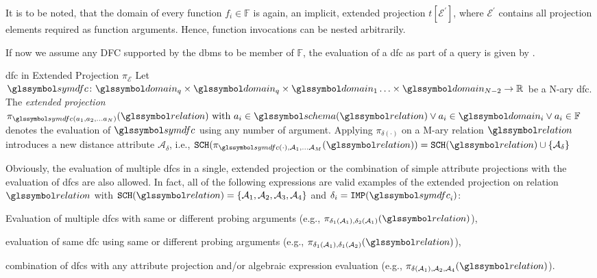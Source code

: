 It is to be noted, that the domain of every function $f_i \in \mathbb{F}$ is again, an implicit, extended projection $t \left[ \mathcal{E}^{'}\right]$, where $\mathcal{E}^{'}$ contains all projection elements required as function arguments. Hence, function invocations can be nested arbitrarily.

If now we assume any DFC supported by the \acrshort{dbms} to be member of $\mathbb{F}$, the evaluation of a \acrshort{dfc} as part of a query is given by .

\begin{definition}[label=definition:dfc_rel]{\acrlong{dfc} in Extended Projection $\pi_{\mathcal{E}}$}{}
    Let $\symdfc \colon \domain_q \times \domain_q \times \domain_{1} \ldots \times \domain_{N-2} \to \mathbb{R}$ be a N-ary \acrshort{dfc}. The \emph{extended projection} $\pi_{\symdfc(a_1, a_2, \ldots a_N)}(\relation) \textrm { with } a_i \in \schema(\relation) \vee a_i \in \domain_i \vee a_i \in \mathbb{F}$ denotes the evaluation of $\symdfc$ using any number of argument. Applying $\pi_{\delta(\cdot)}$ on a M-ary relation $\relation$ introduces a new distance attribute $\mathcal{A}_\delta$, i.e., $\mathtt{SCH}(\pi_{\symdfc(\cdot), \mathcal{A}_1, \ldots \mathcal{A}_M}(\relation)) = \mathtt{SCH}(\relation) \cup \{ \mathcal{A}_\delta \}$
\end{definition}

Obviously, the evaluation of multiple \acrshort{dfc}s in a single, extended projection or the combination of simple attribute projections with the evaluation of \acrshort{dfc}s are also allowed. In fact, all of the following expressions are valid examples of the extended projection on relation $\relation$ with $\mathtt{SCH}(\relation) = \{ \mathcal{A}_1, \mathcal{A}_2, \mathcal{A}_3, \mathcal{A}_4 \}$ and $\delta_i = \mathtt{IMP}(\symdfc_i)$: 
\begin{enumerate*}[label=(\roman*)]
    \item Evaluation of multiple \acrshort{dfc}s with same or different probing arguments (e.g., $\pi_{\delta_1(\mathcal{A}_1), \delta_2(\mathcal{A}_1)}(\relation)$), 
    \item evaluation of same \acrshort{dfc} using same or different probing arguments (e.g., $\pi_{\delta_1(\mathcal{A}_1), \delta_1(\mathcal{A}_2)}(\relation)$),
    \item combination of \acrshort{dfc}s with any attribute projection and/or algebraic expression evaluation (e.g., $\pi_{\delta(\mathcal{A}_1), \mathcal{A}_2, \mathcal{A}_4}(\relation)$).
\end{enumerate*}


